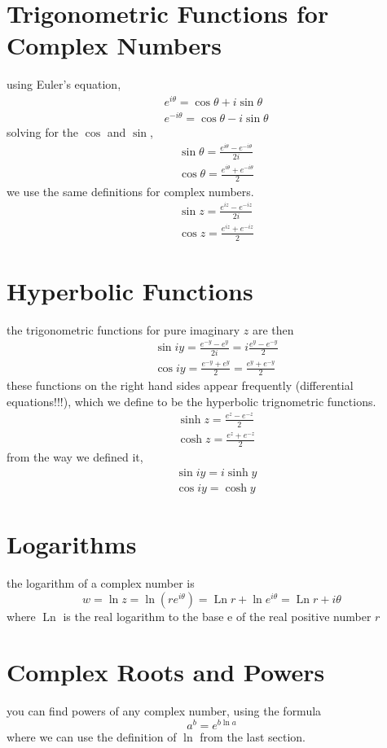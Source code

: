 \documentclass[oneside]{book}
\numberwithin{equation}{chapter} %
\begin{document}
\section{Trigonometric Functions for Complex Numbers}
using Euler's equation,
\begin{align*}
	&e^{i\theta}=\cos\theta+i\sin\theta\\
	&e^{-i\theta}=\cos\theta-i\sin\theta
\end{align*}
solving for the $\cos$ and $\sin$, 
\begin{align}
	&\sin\theta=\frac{e^{i\theta}-e^{-i\theta}}{2i}\\
	&\cos\theta=\frac{e^{i\theta}+e^{-i\theta}}{2}
\end{align}
we use the same definitions for complex numbers. 
\begin{align}
	&\sin z=\frac{e^{iz}-e^{-iz}}{2i}\\
	&\cos z=\frac{e^{iz}+e^{-iz}}{2}
\end{align}
\section{Hyperbolic Functions}
the trigonometric functions for pure imaginary $z$ are then
\begin{align*}
	&\sin iy=\frac{e^{-y}-e^y}{2i}=i\frac{e^y-e^{-y}}2\\
	&\cos iy=\frac{e^{-y}+e^y}2=\frac{e^y+e^{-y}}2
\end{align*}
these functions on the right hand sides appear frequently (differential equations!!!), which we define to be the hyperbolic trignometric functions. 
\begin{align}
	&\sinh z=\frac{e^z-e^{-z}}2\\
	&\cosh z=\frac{e^z+e^{-z}}2
\end{align}
from the way we defined it, 
\begin{align*}
	&\sin iy=i\sinh y\\
	&\cos iy=\cosh y
\end{align*}
\section{Logarithms}
the logarithm of a complex number is 
\begin{equation}
	w=\ln z=\ln(re^{i\theta})=\operatorname{Ln}r+\ln e^{i\theta}=\operatorname{Ln}r+i\theta
\end{equation}
where $\operatorname{Ln}$ is the real logarithm to the base e of the real positive number $r$
\section{Complex Roots and Powers}
you can find powers of any complex number, using the formula
\begin{equation}
	a^b=e^{b\ln a}
\end{equation}
where we can use the definition of $\ln$ from the last section.
\end{document}
